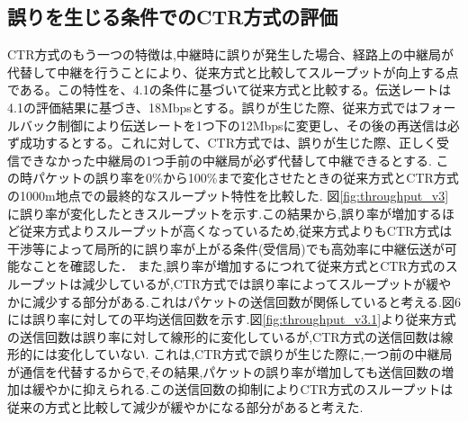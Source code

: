 \documentclass[a4paper,10.5pt]{ltjsarticle}
\begin{document}
\subsection{誤りを生じる条件でのCTR方式の評価}
CTR方式のもう一つの特徴は,中継時に誤りが発生した場合、経路上の中継局が代替して中継を行うことにより、従来方式と比較してスループットが向上する点である。この特性を、4.1の条件に基づいて従来方式と比較する。伝送レートは4.1の評価結果に基づき、18Mbpsとする。誤りが生じた際、従来方式ではフォールバック制御により伝送レートを1つ下の12Mbpsに変更し、その後の再送信は必ず成功するとする。これに対して、CTR方式では、誤りが生じた際、正しく受信できなかった中継局の1つ手前の中継局が必ず代替して中継できるとする.
この時パケットの誤り率を0\%から100\%まで変化させたときの従来方式とCTR方式の1000m地点での最終的なスループット特性を比較した.
図\ref{fig:throughput_v3}に誤り率が変化したときスループットを示す.この結果から,誤り率が増加するほど従来方式よりスループットが高くなっているため,従来方式よりもCTR方式は干渉等によって局所的に誤り率が上がる条件(受信局)でも高効率に中継伝送が可能なことを確認した．
また,誤り率が増加するにつれて従来方式とCTR方式のスループットは減少しているが,CTR方式では誤り率によってスループットが緩やかに減少する部分がある.これはパケットの送信回数が関係していると考える.図6には誤り率に対しての平均送信回数を示す.図\ref{fig:throughput_v3.1}より従来方式の送信回数は誤り率に対して線形的に変化しているが,CTR方式の送信回数は線形的には変化していない.
これは,CTR方式で誤りが生じた際に,一つ前の中継局が通信を代替するからで,その結果,パケットの誤り率が増加しても送信回数の増加は緩やかに抑えられる.この送信回数の抑制によりCTR方式のスループットは従来の方式と比較して減少が緩やかになる部分があると考えた.
\end{document}
